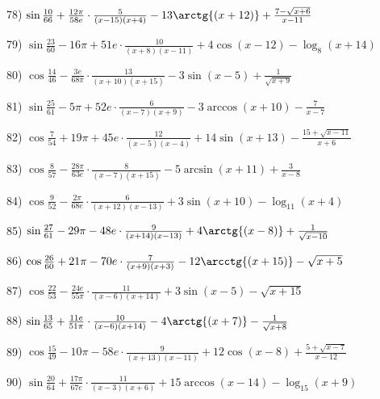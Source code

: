 \documentclass[11pt,ukrainian]{article}
\begin{document}
78) \space 
{ ${\sin\frac{10}{66}} + \frac{12{\pi}}{58 e}\cdot {\frac{5}{(x - 15)(x + 4)}} - {13\arctg{(x + 12)}} + {\frac{7 - \sqrt{x + 6}}{x - 11}}$}
\smallskip\par
79) \space 
{ ${\sin\frac{23}{60}} - 16{\pi} + 51 e\cdot {\frac{10}{(x + 8)(x - 11)}} + {4\cos{(x - 12)}} - {\log_{8}(x + 14)}$}
\smallskip\par
80) \space 
{ ${\cos\frac{14}{46}} - \frac{3 e}{68{\pi}}\cdot {\frac{13}{(x + 10)(x + 15)}} - {3\sin{(x - 5)}} + {\frac{1}{\sqrt{x + 9}}}$}
\smallskip\par
81) \space 
{ ${\sin\frac{25}{61}} - 5{\pi} + 52 e\cdot {\frac{6}{(x - 7)(x + 9)}} - {3\arccos{(x + 10)}} - { \frac{7}{x - 7}}$}
\smallskip\par
82) \space 
{ ${\cos\frac{7}{54}} + 19{\pi} + 45 e\cdot {\frac{12}{(x - 5)(x - 4)}} + {14\sin{(x + 13)}} - {\frac{15 + \sqrt{x - 11}}{x + 6}}$}
\smallskip\par
83) \space 
{ ${\cos\frac{8}{57}} - \frac{28{\pi}}{63 e}\cdot {\frac{8}{(x - 7)(x + 15)}} - {5\arcsin{(x + 11)}} + { \frac{3}{x - 8}}$}
\smallskip\par
84) \space 
{ ${\cos\frac{9}{52}} - \frac{2{\pi}}{68 e}\cdot {\frac{6}{(x + 12)(x - 13)}} + {3\sin{(x + 10)}} - {\log_{11}(x + 4)}$}
\smallskip\par
85) \space 
{ ${\sin\frac{27}{61}} - 29{\pi} - 48 e\cdot {\frac{9}{(x + 14)(x - 13)}} + {4\arctg{(x - 8)}} + {\frac{1}{\sqrt{x - 10}}}$}
\smallskip\par
86) \space 
{ ${\cos\frac{26}{60}} + 21{\pi} - 70 e\cdot {\frac{7}{(x + 9)(x + 3)}} - {12\arcctg{(x + 15)}} - {\sqrt{x + 5}}$}
\smallskip\par
87) \space 
{ ${\cos\frac{22}{53}} - \frac{24 e}{55{\pi}}\cdot {\frac{11}{(x - 6)(x + 14)}} + {3\sin{(x - 5)}} - {\sqrt{x + 15}}$}
\smallskip\par
88) \space 
{ ${\sin\frac{13}{65}} + \frac{11 e}{51{\pi}}\cdot {\frac{10}{(x - 6)(x + 14)}} - {4\arctg{(x + 7)}} - {\frac{1}{\sqrt{x + 8}}}$}
\smallskip\par
89) \space 
{ ${\cos\frac{15}{49}} - 10{\pi} - 58 e\cdot {\frac{9}{(x + 13)(x - 11)}} + {12\cos{(x - 8)}} + {\frac{5 + \sqrt{x - 7}}{x - 12}}$}
\smallskip\par
90) \space 
{ ${\sin\frac{20}{64}} + \frac{17{\pi}}{67 e}\cdot {\frac{11}{(x - 3)(x + 6)}} + {15\arccos{(x - 14)}} - {\log_{15}(x + 9)}$}
\smallskip\par
\end{document}
